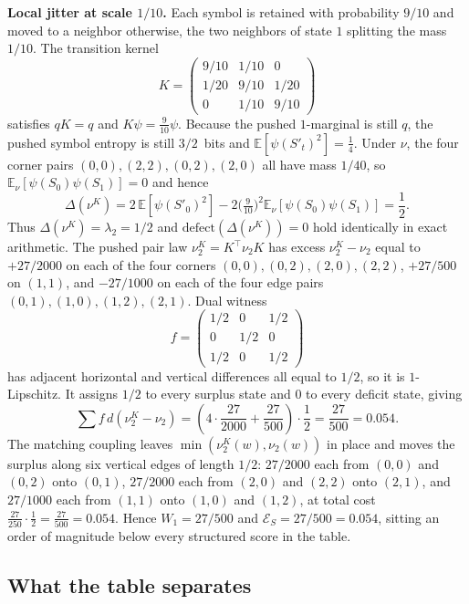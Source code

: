 \documentclass[11pt,reqno]{amsart}
\theoremstyle{remark}
\newcommand{\ES}{\mathcal{E}_S}
\newcommand{\defect}{\mathrm{defect}}
\begin{document}
\medskip\noindent\textbf{Local jitter at scale $1/10$.} Each symbol is retained with probability $9/10$ and moved to a neighbor otherwise, the two neighbors of state $1$ splitting the mass $1/10$. The transition kernel
\[
K = \begin{pmatrix} 9/10 & 1/10 & 0 \\ 1/20 & 9/10 & 1/20 \\ 0 & 1/10 & 9/10 \end{pmatrix}
\]
satisfies $qK = q$ and $K\psi = \tfrac{9}{10}\psi$. Because the pushed $1$-marginal is still $q$, the pushed symbol entropy is still $3/2$~bits and $\mathbb{E}[\psi(S'_t)^2] = \tfrac14$. Under $\nu$, the four corner pairs $(0,0),(2,2),(0,2),(2,0)$ all have mass $1/40$, so $\mathbb{E}_\nu[\psi(S_0)\psi(S_1)] = 0$ and hence
\[
\Delta(\nu^K)
=
2\,\mathbb{E}[\psi(S'_0)^2] - 2\bigl(\tfrac{9}{10}\bigr)^2 \mathbb{E}_\nu[\psi(S_0)\psi(S_1)]
=
\frac12.
\]
Thus $\Delta(\nu^K) = \lambda_2 = 1/2$ and $\defect(\Delta(\nu^K)) = 0$ hold identically in exact arithmetic. The pushed pair law $\nu^K_2 = K^\top \nu_2 K$ has excess $\nu^K_2 - \nu_2$ equal to $+27/2000$ on each of the four corners $(0,0),(0,2),(2,0),(2,2)$, $+27/500$ on $(1,1)$, and $-27/1000$ on each of the four edge pairs $(0,1),(1,0),(1,2),(2,1)$. Dual witness
\[
f = \begin{pmatrix}
1/2 & 0 & 1/2 \\
0 & 1/2 & 0 \\
1/2 & 0 & 1/2
\end{pmatrix}
\]
has adjacent horizontal and vertical differences all equal to $1/2$, so it is $1$-Lipschitz. It assigns $1/2$ to every surplus state and $0$ to every deficit state, giving
\[
\sum f\,d(\nu^K_2 - \nu_2)
=
\left(4\cdot\frac{27}{2000} + \frac{27}{500}\right)\cdot\frac12
=
\frac{27}{500}
=
0.054.
\]
The matching coupling leaves $\min(\nu^K_2(w), \nu_2(w))$ in place and moves the surplus along six vertical edges of length $1/2$: $27/2000$ each from $(0,0)$ and $(0,2)$ onto $(0,1)$, $27/2000$ each from $(2,0)$ and $(2,2)$ onto $(2,1)$, and $27/1000$ each from $(1,1)$ onto $(1,0)$ and $(1,2)$, at total cost $\tfrac{27}{250}\cdot\tfrac12 = \tfrac{27}{500} = 0.054$. Hence $W_1 = 27/500$ and $\ES = 27/500 = 0.054$, sitting an order of magnitude below every structured score in the table.

\subsection{What the table separates}
\end{document}
